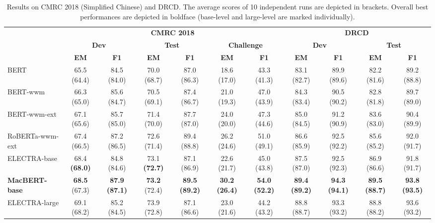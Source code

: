 \documentclass[journal]{IEEEtran}
\begin{document}
\begin{CJK*}{UTF8}{gbsn}
\begin{table*}[htbp]
\caption{\label{result-cmrc2018} Results on CMRC 2018 (Simplified Chinese) and DRCD. The average scores of 10 independent runs are depicted in brackets. Overall best performances are depicted in boldface (base-level and large-level are marked individually).}
\begin{center}
\begin{tabular}{l c c c c c c | c c c c}
\toprule
 & \multicolumn{6}{c}{\centering \bf CMRC 2018} & \multicolumn{4}{c}{\centering \bf DRCD} \\
 & \multicolumn{2}{c}{\centering \bf Dev} & \multicolumn{2}{c}{\centering \bf Test} & \multicolumn{2}{c}{\centering \bf Challenge} & \multicolumn{2}{c}{\centering \bf Dev} & \multicolumn{2}{c}{\centering \bf Test} \\
& \bf EM & \bf F1 & \bf EM & \bf F1  & \bf EM & \bf F1  & \bf EM & \bf F1  & \bf EM & \bf F1  \\
\midrule
BERT   			& 65.5 \tiny(64.4) & 84.5 \tiny(84.0) & 70.0 \tiny(68.7) & 87.0 \tiny(86.3)  & 18.6 \tiny(17.0) & 43.3 \tiny(41.3) & 83.1 \tiny(82.7) & 89.9 \tiny(89.6) & 82.2 \tiny(81.6) & 89.2 \tiny(88.8) \\
BERT-wwm     	& 66.3 \tiny(65.0) & 85.6 \tiny(84.7) & 70.5 \tiny(69.1) & 87.4 \tiny(86.7)  & 21.0 \tiny(19.3) & 47.0 \tiny(43.9) & 84.3 \tiny(83.4) & 90.5 \tiny(90.2) & 82.8 \tiny(81.8) & 89.7 \tiny(89.0) \\
BERT-wwm-ext	& 67.1 \tiny(65.6) & 85.7 \tiny(85.0) & 71.4 \tiny(70.0) & 87.7 \tiny(87.0) & 24.0 \tiny(20.0) & 47.3 \tiny(44.6) & 85.0 \tiny(84.5) & 91.2 \tiny(90.9) & 83.6 \tiny(83.0) & 90.4 \tiny(89.9)  \\
RoBERTa-wwm-ext & 67.4 \tiny(66.5) & 87.2 \tiny(86.5) & 72.6 \tiny(71.4) & 89.4 \tiny(88.8) & 26.2 \tiny(24.6) & 51.0 \tiny(49.1) & 86.6 \tiny(85.9) & 92.5 \tiny(92.2) & 85.6 \tiny(85.2) & 92.0 \tiny(91.7)  \\
ELECTRA-base & 68.4 \bf\tiny(68.0) & 84.8 \tiny(84.6) & 73.1 \bf\tiny(72.7) & 87.1 \tiny(86.9) & 22.6 \tiny(21.7) & 45.0 \tiny(43.8) & 87.5 \tiny(87.0) & 92.5 \tiny(92.3) & 86.9 \tiny(86.6) & 91.8 \tiny(91.7) \\
\bf MacBERT-base & {\bf 68.5} \tiny(67.3) & \bf 87.9 \tiny(87.1) & {\bf 73.2} \tiny(72.4) & \bf 89.5 \tiny(89.2) & \bf 30.2 \tiny(26.4) & \bf 54.0 \tiny(52.2) & \bf 89.4 \tiny(89.2) & \bf 94.3 \tiny(94.1) & \bf 89.5 \tiny(88.7) & \bf 93.8 \tiny(93.5) \\
\midrule
ELECTRA-large & 69.1 \tiny(68.2) & 85.2 \tiny(84.5) & 73.9 \tiny(72.8) & 87.1 \tiny(86.6) & 23.0 \tiny(21.6) & 44.2 \tiny(43.2) & 88.8 \tiny(88.7) & 93.3 \tiny(93.2) & 88.8 \tiny(88.2) & 93.6 \tiny(93.2) \\

\end{tabular}
\end{center}
\end{table*}
\end{CJK*}
\end{document}
